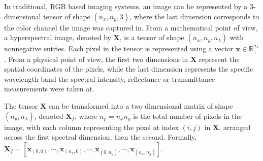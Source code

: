 In traditional, RGB based imaging systems, an image can be represented by a 3-dimensional tensor of shape $(n_x, n_y, 3)$, where the last dimension corresponds to the color channel the image was captured in. From a mathematical point of view, a hyperspectral image, denoted by $\mathbf{X}$, is a tensor of shape $(n_x, n_y, n_\lambda)$ with nonnegative entries. Each pixel in the tensor is represented using a vector $\mathbf{x} \in \mathbb{R}_+^{n_\lambda}$. From a physical point of view, the first two dimensions in $\mathbf{X}$ represent the spatial coordinates  of the pixels, while the last dimension represents the specific wavelength band the spectral intensity, reflectance or transmittance measurements were taken at.

The tensor $\mathbf{X}$ can be transformed into a two-dimensional matrix of shape $(n_p, n_\lambda)$, denoted $\mathbf{X}_f$, where $n_p = n_x n_y$ is the total number of pixels in the image, with each column representing the pixel at index $(i,j)$ in $\mathbf{X}$, arranged across the first spectral dimension, then the second. Formally, $
\mathbf{X}_f = \left[ \mathbf{x}_{(0,0)},  \cdots, \mathbf{x}_{(n_x,0)}, \cdots, \mathbf{x}_{(0,n_y)}, \cdots, \mathbf{x}_{(n_x, n_y)} \right]. 
$

